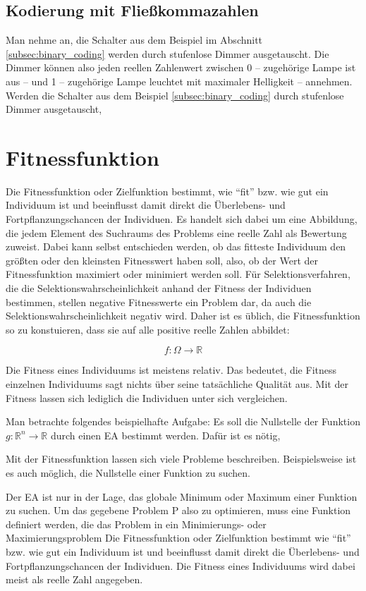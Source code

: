 \subsection{Kodierung mit Fließkommazahlen}
Man nehme an, die Schalter aus dem Beispiel im Abschnitt \ref{subsec:binary_coding} werden durch stufenlose Dimmer ausgetauscht. Die Dimmer können also jeden reellen Zahlenwert zwischen 0 -- zugehörige Lampe ist aus -- und 1 -- zugehörige Lampe leuchtet mit maximaler Helligkeit -- annehmen. 
Werden die Schalter aus dem Beispiel \ref{subsec:binary_coding} durch stufenlose Dimmer ausgetauscht, 

\section{Fitnessfunktion}
Die Fitnessfunktion oder Zielfunktion bestimmt, wie "`fit"' bzw. wie gut ein Individuum ist und beeinflusst damit direkt die Überlebens- und Fortpflanzungschancen der Individuen. Es handelt sich dabei um  eine Abbildung, die jedem Element des Suchraums des Problems eine reelle Zahl als Bewertung zuweist. Dabei kann selbst entschieden werden, ob das fitteste Individuum den größten oder den kleinsten Fitnesswert haben soll, also, ob der Wert der Fitnessfunktion maximiert oder minimiert werden soll. Für Selektionsverfahren, die die Selektionswahrscheinlichkeit anhand der Fitness der Individuen bestimmen, stellen negative Fitnesswerte ein Problem dar, da auch die Selektionswahrscheinlichkeit negativ wird. Daher ist es üblich, die Fitnessfunktion so zu konstuieren, dass sie auf alle positive reelle Zahlen abbildet:

\begin{equation}
f: \Omega \to \mathbb{R}
\end{equation}

Die Fitness eines Individuums ist meistens relativ. Das bedeutet, die Fitness einzelnen Individuums sagt nichts über seine tatsächliche Qualität aus. Mit der Fitness lassen sich lediglich die Individuen unter sich vergleichen. 

Man betrachte folgendes beispielhafte Aufgabe: Es soll die Nullstelle der Funktion $g: \mathbb{R}^n \to \mathbb{R}$ durch einen EA bestimmt werden. Dafür ist es nötig, 

Mit der Fitnessfunktion lassen sich viele Probleme beschreiben. Beispielsweise ist es auch möglich, die Nullstelle einer Funktion zu suchen. 

Der EA ist nur in der Lage, das globale Minimum oder Maximum einer Funktion zu suchen. Um das gegebene Problem P also zu optimieren, muss eine Funktion definiert werden, die das Problem in ein Minimierungs- oder Maximierungsproblem 
Die Fitnessfunktion oder Zielfunktion bestimmt wie "`fit"' bzw. wie gut ein Individuum ist und beeinflusst damit direkt die Überlebens- und Fortpflanzungschancen der Individuen. Die Fitness eines Individuums wird dabei meist als reelle Zahl angegeben. 


